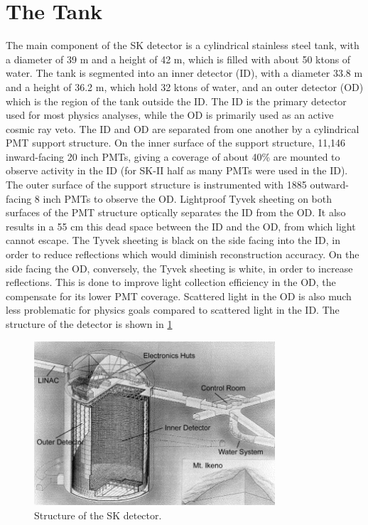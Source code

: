 \section{The Tank}
\label{sec:tank}
The main component of the SK detector is a cylindrical stainless steel tank, with a diameter of 39 m and a height of 42 m, which is filled with about 50 ktons of water.  The tank is segmented into an inner detector (ID), with a diameter 33.8 m and a height of 36.2 m, which hold 32 ktons of water, and an outer detector (OD) which is the region of the tank outside the ID.  The ID is the primary detector used for most physics analyses, while the OD is primarily used as an active cosmic ray veto.  The ID and OD are separated from one another by a cylindrical PMT support structure.  On the inner surface of the support structure, 11,146 inward-facing 20 inch PMTs, giving a coverage of about 40\% are mounted to observe activity in the ID (for SK-II half as many PMTs were used in the ID).  The outer surface of the support structure is instrumented with 1885 outward-facing 8 inch PMTs to observe the OD.  Lightproof Tyvek sheeting on both surfaces of the PMT structure optically separates the ID from the OD.  It also results in a 55 cm this dead space between the ID and the OD, from which light cannot escape.  The Tyvek sheeting is black on the side facing into the ID, in order to reduce reflections which would diminish reconstruction accuracy.  On the side facing the OD, conversely, the Tyvek sheeting is white, in order to increase reflections.  This is done to improve light collection efficiency in the OD, the compensate for its lower PMT coverage.  Scattered light in the OD is also much less problematic for physics goals compared to scattered light in the ID.  The structure of the detector is shown in \cref{fig:sk_detector_diagrams}

\begin{figure}
\centering
\includegraphics[width=0.8\textwidth]{figures/sk_detector_under_mountain.jpg}
\caption{Structure of the SK detector. \cite{Fukuda:2002uc}}
\label{fig:sk_detector_diagrams} 
\end{figure}

